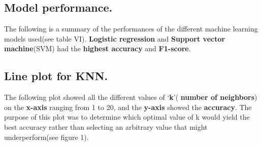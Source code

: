 \documentclass[
  11pt,
]{ieee}
\begin{document}
\subsection{Model performance.}\label{model-performance.}

\vspace{0.8em}

The following is a summary of the performances of the different machine
learning models used(see table VI). \textbf{Logistic regression} and
\textbf{Support vector machine}(SVM) had the \textbf{highest accuracy}
and \textbf{F1-score}.

\begin{table}[!h]
\centering
\caption{Machine learning model results}
\centering
{}
\end{table}

\subsection{Line plot for KNN.}\label{line-plot-for-knn.}

\vspace{0.8em}

The following plot showed all the different values of `\textbf{k}'(
\textbf{number of neighbors}) on the \textbf{x-axis} ranging from 1 to
20, and the \textbf{y-axis} showed the \textbf{accuracy}. The purpose of
this plot was to determine which optimal value of k would yield the best
accuracy rather than selecting an arbitrary value that might
underperform(see figure 1).
\end{document}
